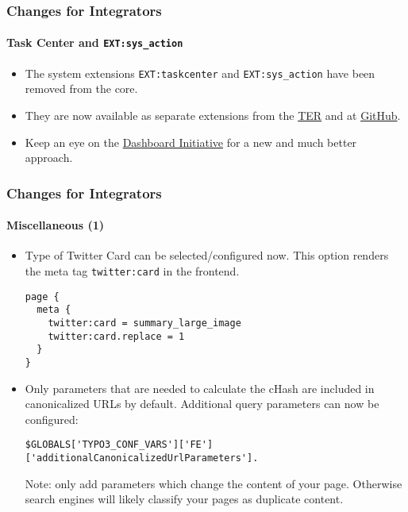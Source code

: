 
\begin{frame}[fragile]
	\frametitle{Changes for Integrators}
	\framesubtitle{Task Center and \texttt{EXT:sys\_action}}

	\begin{itemize}

		\item The system extensions \texttt{EXT:taskcenter} and \texttt{EXT:sys\_action}
			have been removed from the core.

		\item They are now available as separate extensions from the
			\href{https://extensions.typo3.org/}{TER}
			and at
			\href{https://github.com/FriendsOfTYPO3}{GitHub}.

		\item Keep an eye on the
			\href{https://typo3.org/community/teams/typo3-development/initiatives/typo3-dashboard-initiative/}{Dashboard Initiative}
			for a new and much better approach.

	\end{itemize}

\end{frame}


\begin{frame}[fragile]
	\frametitle{Changes for Integrators}
	\framesubtitle{Miscellaneous (1)}

	\lstset{basicstyle=\tiny\ttfamily}

	\begin{itemize}

		\item Type of Twitter Card can be selected/configured now.
			This option renders the meta tag \texttt{twitter:card} in the frontend.

\begin{lstlisting}
page {
  meta {
    twitter:card = summary_large_image
    twitter:card.replace = 1
  }
}
\end{lstlisting}

		\item Only parameters that are needed to calculate the cHash are included in canonicalized URLs by default.
			Additional query parameters can now be configured:

\begin{lstlisting}
$GLOBALS['TYPO3_CONF_VARS']['FE']['additionalCanonicalizedUrlParameters'].
\end{lstlisting}

		\smaller
			Note: only add parameters which change the content of your page. Otherwise search engines will likely classify your pages as duplicate content.
		\normalsize

	\end{itemize}

\end{frame}

